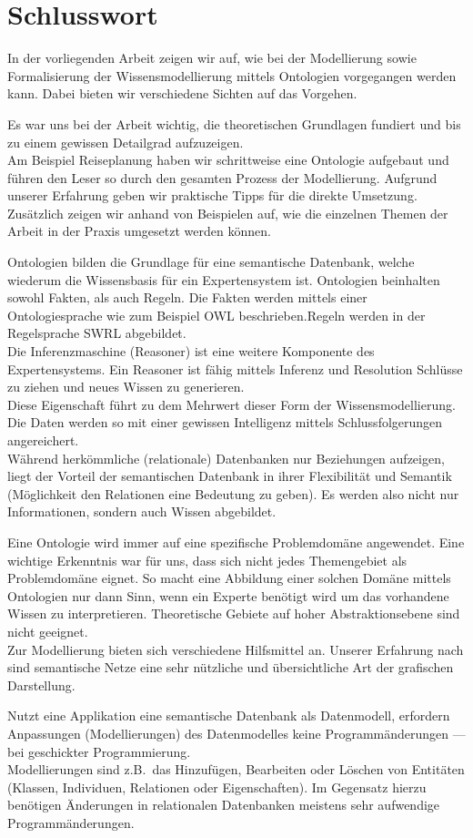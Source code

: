 \chapter{Schlusswort}
\label{chap:schlusswort}

In der vorliegenden Arbeit zeigen wir auf, wie bei der Modellierung sowie Formalisierung der Wissensmodellierung mittels Ontologien vorgegangen werden kann. Dabei bieten wir verschiedene Sichten auf das Vorgehen.

Es war uns bei der Arbeit wichtig, die theoretischen Grundlagen fundiert und bis zu einem gewissen Detailgrad aufzuzeigen. \\
Am Beispiel Reiseplanung haben wir schrittweise eine Ontologie aufgebaut und führen den Leser so durch den gesamten Prozess der Modellierung. Aufgrund unserer Erfahrung geben wir praktische Tipps für die direkte Umsetzung. Zusätzlich zeigen wir anhand von Beispielen auf, wie die einzelnen Themen der Arbeit in der Praxis umgesetzt werden können.

Ontologien bilden die Grundlage für eine semantische Datenbank, welche wiederum die Wissensbasis für ein Expertensystem ist. Ontologien beinhalten sowohl Fakten, als auch Regeln. Die Fakten werden mittels einer Ontologiesprache wie zum Beispiel OWL beschrieben.Regeln werden in der Regelsprache SWRL abgebildet.\\
Die Inferenzmaschine (Reasoner) ist eine weitere Komponente des Expertensystems. Ein Reasoner ist fähig mittels Inferenz und Resolution Schlüsse zu ziehen und neues Wissen zu generieren.\\
Diese Eigenschaft führt zu dem Mehrwert dieser Form der Wissensmodellierung. Die Daten werden so mit einer gewissen Intelligenz mittels Schlussfolgerungen angereichert.\\
Während herkömmliche (relationale) Datenbanken nur Beziehungen aufzeigen, liegt der Vorteil der semantischen Datenbank in ihrer Flexibilität und Semantik (Möglichkeit den Relationen eine Bedeutung zu geben). Es werden also nicht nur Informationen, sondern auch Wissen abgebildet.

Eine Ontologie wird immer auf eine spezifische Problemdomäne angewendet. Eine wichtige Erkenntnis war für uns, dass sich nicht jedes Themengebiet als Problemdomäne eignet. So macht eine Abbildung einer solchen Domäne mittels Ontologien nur dann Sinn, wenn ein Experte benötigt wird um das vorhandene Wissen zu interpretieren.
Theoretische Gebiete auf hoher Abstraktionsebene sind nicht geeignet.\\
Zur Modellierung bieten sich verschiedene Hilfsmittel an. Unserer Erfahrung nach sind semantische Netze eine sehr nützliche und übersichtliche Art der grafischen Darstellung.

Nutzt eine Applikation eine semantische Datenbank als Datenmodell, erfordern Anpassungen (Modellierungen) des Datenmodelles keine Programmänderungen --- bei geschickter Programmierung.\\
Modellierungen sind z.B.\ das Hinzufügen, Bearbeiten oder Löschen von Entitäten (Klassen, Individuen, Relationen oder Eigenschaften).
Im Gegensatz hierzu benötigen Änderungen in relationalen Datenbanken meistens sehr aufwendige Programmänderungen.
